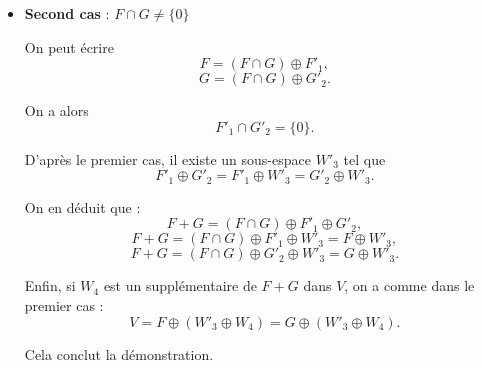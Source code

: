 \begin{solution}
\begin{itemize}
		\item \textbf{Second cas} : \( F \cap G \neq \{0\} \)
		
		On peut écrire
		\[
		F = (F \cap G) \oplus F'_1,
		\]
		\[
		G = (F \cap G) \oplus G'_2.
		\]
		
		On a alors 
		\[
		F'_1 \cap G'_2 = \{0\}.
		\]
		
		D'après le premier cas, il existe un sous-espace \( W'_3 \) tel que
		\[
		F'_1 \oplus G'_2 = F'_1 \oplus W'_3 = G'_2 \oplus W'_3.
		\]
		
		On en déduit que :
		\[
		F + G = (F \cap G) \oplus F'_1 \oplus G'_2,
		\]
		\[
		F + G = (F \cap G) \oplus F'_1 \oplus W'_3 = F \oplus W'_3,
		\]
		\[
		F + G = (F \cap G) \oplus G'_2 \oplus W'_3 = G \oplus W'_3.
		\]
		
		Enfin, si \( W_4 \) est un supplémentaire de \( F + G \) dans \( V \), on a comme dans le premier cas :
		\[
		V = F \oplus (W'_3 \oplus W_4) = G \oplus (W'_3 \oplus W_4).
		\]
		
		Cela conclut la démonstration.
		
	\end{itemize}
\end{solution}  